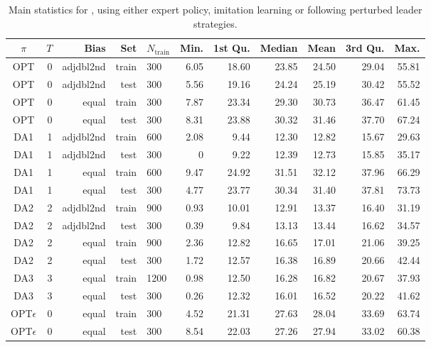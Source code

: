 \begin{table}[t]
\caption{Main statistics for  \namerho, using either expert
   policy, imitation learning or following perturbed leader 
   strategies.}\label{tbl:IL:stats} 
\centering
\begin{tabular}{c@{}rrrlrrrrrr}
  \toprule
  $\pi$ & $T$ & Bias & Set & $N_{\text{train}}$ & Min. & 1st Qu. & Median & 
  Mean & 3rd Qu. & Max. \\ 
  \midrule  
  OPT & 0 & adjdbl2nd & train & 300 & 6.05 & 18.60 & 23.85 & 24.50 & 
  29.04 & 55.81 \\ 
  OPT & 0 & adjdbl2nd & test & 300 & 5.56 & 19.16 & 24.24 & 25.19 & 
  30.42 & 55.52 \\ 
  OPT & 0 & equal & train & 300 & 7.87 & 23.34 & 29.30 & 30.73 & 36.47 & 
  61.45 \\ 
  OPT & 0 & equal & test & 300 & 8.31 & 23.88 & 30.32 & 31.46 & 37.70 & 
  67.24 \\ 
  DA1 & 1 & adjdbl2nd & train & 600 & 2.08 & 9.44 & 12.30 & 12.82 & 15.67 
  & 29.63 \\ 
  DA1 & 1 & adjdbl2nd & test & 300 & 0 & 9.22 & 12.39 & 12.73 & 15.85 
  & 35.17 \\ 
  DA1 & 1 & equal & train & 600 & 9.47 & 24.92 & 31.51 & 32.12 & 37.96 & 
  66.29 \\ 
  DA1 & 1 & equal & test & 300 & 4.77 & 23.77 & 30.34 & 31.40 & 37.81 & 
  73.73 \\ 
  DA2 & 2 & adjdbl2nd & train & 900 & 0.93 & 10.01 & 12.91 & 13.37 & 
  16.40 & 31.19 \\ 
  DA2 & 2 & adjdbl2nd & test & 300 & 0.39 & 9.84 & 13.13 & 13.44 & 16.62 
  & 34.57 \\ 
  DA2 & 2 & equal & train & 900 & 2.36 & 12.82 & 16.65 & 17.01 & 21.06 & 
  39.25 \\ 
  DA2 & 2 & equal & test & 300 & 1.72 & 12.57 & 16.38 & 16.89 & 20.66 & 
  42.44 \\ 
  DA3 & 3 & equal & train & 1200 & 0.98 & 12.50 & 16.28 & 16.82 & 20.67 & 
  37.93 \\ 
  DA3 & 3 & equal & test & 300 & 0.26 & 12.32 & 16.01 & 16.52 & 20.22 & 
  41.62 \\ 
  \midrule
  OPT$\epsilon$ & 0 & equal & train & 300 & 4.52 & 21.31 & 27.63 & 28.04 & 
  33.69 & 63.74 \\ 
  OPT$\epsilon$ & 0 & equal & test & 300 & 8.54 & 22.03 & 27.26 & 27.94 & 33.02 
  & 60.38 \\ 
  \bottomrule
\end{tabular}
\end{table}